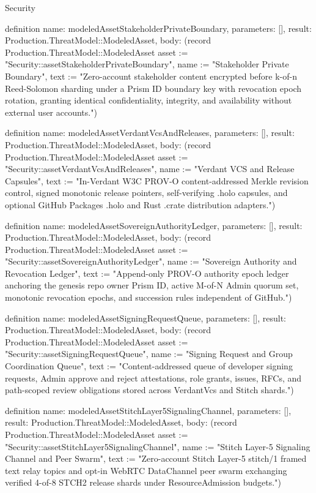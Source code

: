 \begin{lexlean}{Security}
\begin{semanticmodule}
definition{
  name: modeledAssetStakeholderPrivateBoundary,
  parameters: [],
  result: Production.ThreatModel::ModeledAsset,
  body: (record Production.ThreatModel::ModeledAsset {asset := "Security::assetStakeholderPrivateBoundary", name := "Stakeholder Private Boundary", text := "Zero-account stakeholder content encrypted before k-of-n Reed-Solomon sharding under a Prism ID boundary key with revocation epoch rotation, granting identical confidentiality, integrity, and availability without external user accounts."})
}

definition{
  name: modeledAssetVerdantVcsAndReleases,
  parameters: [],
  result: Production.ThreatModel::ModeledAsset,
  body: (record Production.ThreatModel::ModeledAsset {asset := "Security::assetVerdantVcsAndReleases", name := "Verdant VCS and Release Capsules", text := "In-Verdant W3C PROV-O content-addressed Merkle revision control, signed monotonic release pointers, self-verifying .holo capsules, and optional GitHub Packages .holo and Rust .crate distribution adapters."})
}

definition{
  name: modeledAssetSovereignAuthorityLedger,
  parameters: [],
  result: Production.ThreatModel::ModeledAsset,
  body: (record Production.ThreatModel::ModeledAsset {asset := "Security::assetSovereignAuthorityLedger", name := "Sovereign Authority and Revocation Ledger", text := "Append-only PROV-O authority epoch ledger anchoring the genesis repo owner Prism ID, active M-of-N Admin quorum set, monotonic revocation epochs, and succession rules independent of GitHub."})
}

definition{
  name: modeledAssetSigningRequestQueue,
  parameters: [],
  result: Production.ThreatModel::ModeledAsset,
  body: (record Production.ThreatModel::ModeledAsset {asset := "Security::assetSigningRequestQueue", name := "Signing Request and Group Coordination Queue", text := "Content-addressed queue of developer signing requests, Admin approve and reject attestations, role grants, issues, RFCs, and path-scoped review obligations stored across VerdantVcs and Stitch shards."})
}

definition{
  name: modeledAssetStitchLayer5SignalingChannel,
  parameters: [],
  result: Production.ThreatModel::ModeledAsset,
  body: (record Production.ThreatModel::ModeledAsset {asset := "Security::assetStitchLayer5SignalingChannel", name := "Stitch Layer-5 Signaling Channel and Peer Swarm", text := "Zero-account Stitch Layer-5 stitch/1 framed text relay topics and opt-in WebRTC DataChannel peer swarm exchanging verified 4-of-8 STCH2 release shards under ResourceAdmission budgets."})
}


\end{semanticmodule}
\end{lexlean}
